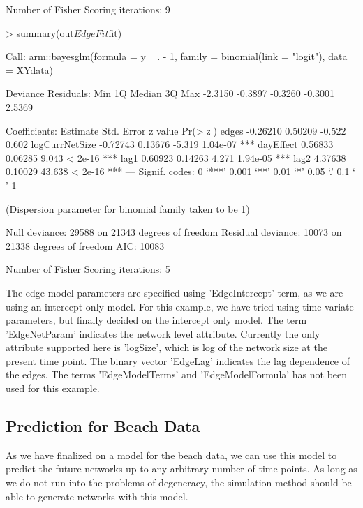 \documentclass[12pt]{article}
\begin{document}
\begin{Schunk}
\begin{Soutput}
Number of Fisher Scoring iterations: 9
\end{Soutput}
\begin{Sinput}
> summary(out$EdgeFit$fit)
\end{Sinput}
\begin{Soutput}
Call:
arm::bayesglm(formula = y ~ . - 1, family = binomial(link = "logit"), 
    data = XYdata)

Deviance Residuals: 
    Min       1Q   Median       3Q      Max  
-2.3150  -0.3897  -0.3260  -0.3001   2.5369  

Coefficients:
               Estimate Std. Error z value Pr(>|z|)    
edges          -0.26210    0.50209  -0.522    0.602    
logCurrNetSize -0.72743    0.13676  -5.319 1.04e-07 ***
dayEffect       0.56833    0.06285   9.043  < 2e-16 ***
lag1            0.60923    0.14263   4.271 1.94e-05 ***
lag2            4.37638    0.10029  43.638  < 2e-16 ***
---
Signif. codes:  0 ‘***’ 0.001 ‘**’ 0.01 ‘*’ 0.05 ‘.’ 0.1 ‘ ’ 1

(Dispersion parameter for binomial family taken to be 1)

    Null deviance: 29588  on 21343  degrees of freedom
Residual deviance: 10073  on 21338  degrees of freedom
AIC: 10083

Number of Fisher Scoring iterations: 5
\end{Soutput}
\end{Schunk}

The edge model parameters are specified using 'EdgeIntercept' term, as we are using an intercept only model. For this example, we have tried using time variate parameters, but finally decided on the intercept only model. The term 'EdgeNetParam' indicates the network level attribute. Currently the only attribute supported here is 'logSize', which is log of the network size at the present time point. The binary vector 'EdgeLag' indicates the lag dependence of the edges. The terms 'EdgeModelTerms' and 'EdgeModelFormula' has not been used for this example.

\subsection{Prediction for Beach Data}
\label{sec:pred-beach-data}

As we have finalized on a model for the beach data, we can use this model to predict the future networks up to any arbitrary number of time points. As long as we do not run into the problems of degeneracy, the simulation method should be able to generate networks with this model.
\end{document}
